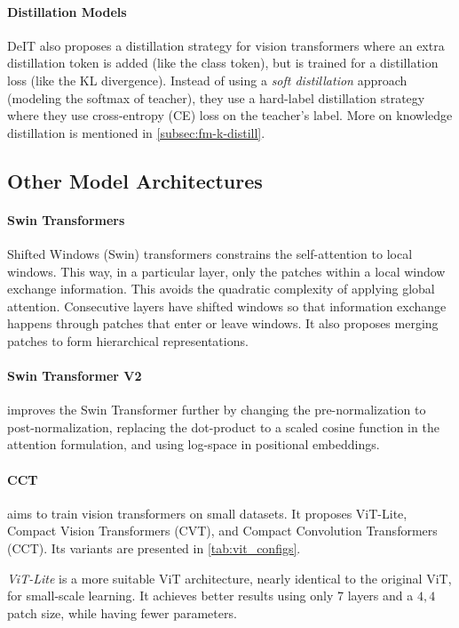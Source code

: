 \paragraph{Distillation Models} DeIT also proposes a distillation
strategy for vision transformers where an extra distillation token is
added (like the class token), but is trained for a distillation loss
(like the KL divergence). Instead of using a \emph{soft distillation}
approach (modeling the softmax of teacher), they use a hard-label
distillation strategy where they use cross-entropy (CE) loss on the
teacher's label. More on knowledge distillation is mentioned in
\cref{subsec:fm-k-distill}.

\subsection{Other Model Architectures}

\paragraph{Swin Transformers \cite{Liu2021SwinTH}} Shifted Windows
(Swin) transformers constrains the self-attention to local windows.
This way, in a particular layer, only the patches within a local
window exchange information. This avoids the quadratic complexity of
applying global attention. Consecutive layers have shifted windows so
that information exchange happens through patches that enter or leave
windows. It also proposes merging patches to form hierarchical
representations.

\paragraph{Swin Transformer V2 \cite{Liu2021SwinTV}} improves the Swin
Transformer further by changing the pre-normalization to
post-normalization, replacing the dot-product to a scaled cosine
function in the attention formulation, and using log-space in
positional embeddings.

\paragraph{CCT \cite{Hassani2021EscapingTB}} aims to train vision
transformers on small datasets. It proposes ViT-Lite, Compact Vision
Transformers (CVT), and Compact Convolution Transformers (CCT). Its
variants are presented in \cref{tab:vit_configs}.

\emph{ViT-Lite} is a more suitable ViT architecture, nearly identical
to the original ViT, for small-scale learning. It achieves better
results using only 7 layers and a $4, 4$ patch size, while having 
fewer parameters.

